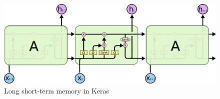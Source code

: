 \begin{center}
	\begin{figure}[H]
		\centering
		\includegraphics[width=1\columnwidth]{images/chap3/lstm-chain.png}
		\caption{Long short-term memory in Keras}
		\label{chap3:lstm-chain}
	\end{figure}
\end{center}

